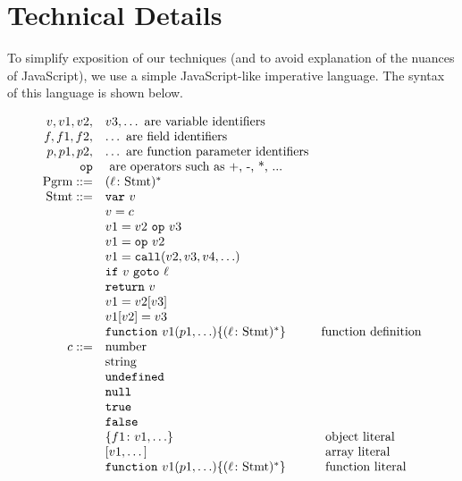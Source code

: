 \documentclass{sig-alternate}
\newcommand \dsl [1] {\ensuremath{{\tt #1}}\xspace}
\begin{document}
\section{Technical Details}
\label{sec:technical-details}

To simplify exposition of our techniques (and to avoid explanation of
the nuances of JavaScript), we use a simple JavaScript-like imperative
language.  The syntax of this language is shown below.

{\small
\[
\begin{array}{rll}
v, v1, v2, & v3, \ldots \mbox{ are variable identifiers}\\
f, f1, f2, & \ldots \mbox{ are field identifiers}\\
p, p1, p2, & \ldots \mbox{ are function parameter identifiers}\\
\dsl{op} & \mbox{ are operators such as +, -, *, ...} \\
\mbox{Pgrm} ::= & (\ell\colon \mbox{Stmt})^*\\
\mbox{Stmt} ::= &  \dsl{var}\ v\\
  & v = c\\
  &   v1 = v2\ \dsl{op}\ v3\\
  &   v1 = \dsl{op}\ v2\\
  &   v1 = \dsl{call}(v2, v3, v4, \ldots)\\
  &   \dsl{if}\ v \ \dsl{goto}\ \ell\\
  &   \dsl{return}\ v\\
  &   v1 = v2[v3]\\
  &   v1[v2] = v3\\
  &   \dsl{function}\ v1(p1, \ldots) \{ (\ell\colon \mbox{Stmt})^* \} & \mbox{function definition}\\
c ::= & \mbox{number}\\
  & \mbox{string} \\
  & \dsl{undefined} \\
  & \dsl{null} \\
  & \dsl{true}\\
  & \dsl{false}\\
  & \{f1\colon v1, \ldots\} &\mbox{ object literal}\\
  & [v1, \dots] &\mbox{ array literal}\\
  & \dsl{function}\ v1(p1, \ldots) \{ (\ell\colon \mbox{Stmt})^* \} & \mbox{
    function literal}\\
\end{array}
\]
}
\end{document}

